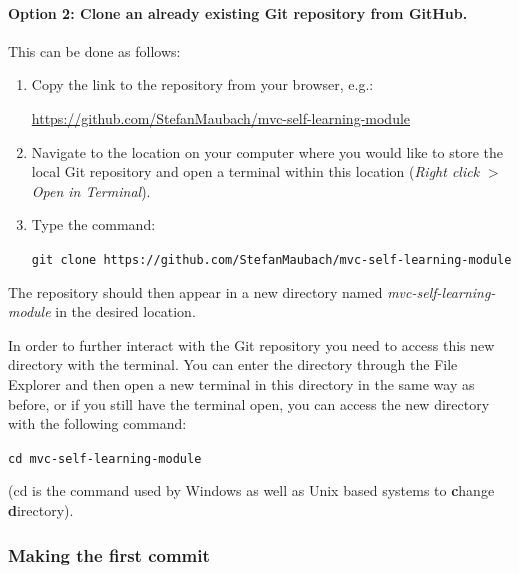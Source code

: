 \documentclass[a4paper,10pt]{article}
\begin{document}
\paragraph{Option 2: Clone an already existing Git repository from GitHub.} This can be done as follows:
\begin{enumerate}
    \item Copy the link to the repository from your browser, e.g.: 

    \url{https://github.com/StefanMaubach/mvc-self-learning-module}
    
    \item Navigate to the location on your computer where you would like to store the local Git repository and open a terminal within this location (\emph{Right click} $>$ \emph{Open in Terminal}).
    
    \item Type the command:

    \texttt{git clone https://github.com/StefanMaubach/mvc-self-learning-module}
\end{enumerate}
The repository should then appear in a new directory named \emph{mvc-self-learning-module} in the desired location. 

In order to further interact with the Git repository you need to access this new directory with the terminal. You can enter the directory through the File Explorer and then open a new terminal in this directory in the same way as before, or if you still have the terminal open, you can access the new directory with the following command:

\texttt{cd mvc-self-learning-module}

(cd is the command used by Windows as well as Unix based systems to \textbf{c}hange \textbf{d}irectory).

\subsubsection{Making the first commit}
\label{first_commit}
\end{document}
